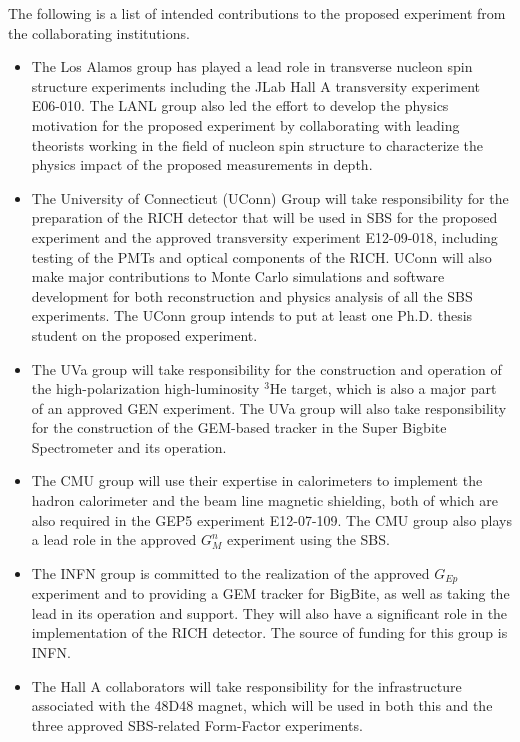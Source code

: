 The following is a list of intended contributions to the proposed experiment from the collaborating institutions. 
\begin{itemize}  

\item The Los Alamos group has played a lead role
  in transverse nucleon spin structure experiments including the JLab Hall A
  transversity experiment E06-010. The LANL group also led the effort to develop the physics motivation for the proposed experiment by collaborating with leading
  theorists working in the field of nucleon spin structure to characterize the physics
  impact of the proposed measurements in depth.

\item  The University of Connecticut (UConn) Group will take responsibility for the preparation of the RICH detector that will be used in SBS for the proposed experiment and the approved transversity experiment E12-09-018, including testing of the PMTs and optical components of the RICH. UConn will also make major contributions to Monte Carlo simulations and software development for both reconstruction and physics analysis of all the SBS experiments. The UConn group intends to put at least one Ph.D. thesis student on the proposed experiment.

\item The UVa group will take responsibility for the construction and operation
  of the high-polarization high-luminosity $^3$He target, which is also a major part
  of an approved GEN experiment.
  The UVa group will also take responsibility for the construction of the GEM-based tracker
  in the Super Bigbite Spectrometer and its operation. 

\item The CMU group will use their expertise in calorimeters to implement the hadron calorimeter
  and the beam line magnetic shielding, both of which are also required
  in the GEP5 experiment E12-07-109. The CMU group also plays a lead role in
  the approved $G_M^n$ experiment using the SBS.
  
\item The INFN group is committed to the realization of the approved $G_{Ep}$ experiment and 
  to providing a GEM tracker for BigBite, as well as taking the lead in its operation and support. 
  They will also have a significant role in the implementation of the RICH detector.   
  The source of funding for this group is INFN.

\item The Hall A collaborators will take responsibility for the infrastructure associated with
  the 48D48 magnet, which will be used in both this and the three
  approved SBS-related Form-Factor experiments.
\end{itemize}
